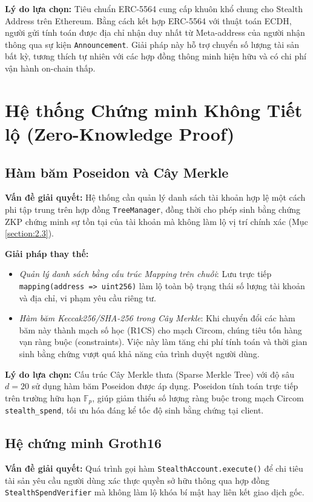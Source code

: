 \documentclass[../DoAn.tex]{subfiles}
\begin{document}
\textbf{Lý do lựa chọn:} Tiêu chuẩn ERC-5564 \cite{erc5564} cung cấp khuôn khổ chung cho Stealth Address trên Ethereum. Bằng cách kết hợp ERC-5564 với thuật toán ECDH, người gửi tính toán được địa chỉ nhận duy nhất từ Meta-address của người nhận thông qua sự kiện \texttt{Announcement}. Giải pháp này hỗ trợ chuyển số lượng tài sản bất kỳ, tương thích tự nhiên với các hợp đồng thông minh hiện hữu và có chi phí vận hành on-chain thấp.

\section{Hệ thống Chứng minh Không Tiết lộ (Zero-Knowledge Proof)}
\label{sec:3.2}

\subsection{Hàm băm Poseidon và Cây Merkle}
\textbf{Vấn đề giải quyết:} Hệ thống cần quản lý danh sách tài khoản hợp lệ một cách phi tập trung trên hợp đồng \texttt{TreeManager}, đồng thời cho phép sinh bằng chứng ZKP chứng minh sự tồn tại của tài khoản mà không làm lộ vị trí chính xác (Mục \ref{section:2.3}).

\textbf{Giải pháp thay thế:}
\begin{itemize}
    \item \textit{Quản lý danh sách bằng cấu trúc Mapping trên chuỗi}: Lưu trực tiếp \texttt{mapping(address => uint256)} làm lộ toàn bộ trạng thái số lượng tài khoản và địa chỉ, vi phạm yêu cầu riêng tư.
    \item \textit{Hàm băm Keccak256/SHA-256 trong Cây Merkle}: Khi chuyển đổi các hàm băm này thành mạch số học (R1CS) cho mạch Circom, chúng tiêu tốn hàng vạn ràng buộc (constraints). Việc này làm tăng chi phí tính toán và thời gian sinh bằng chứng vượt quá khả năng của trình duyệt người dùng.
\end{itemize}

\textbf{Lý do lựa chọn:} Cấu trúc Cây Merkle thưa (Sparse Merkle Tree) với độ sâu $d=20$ sử dụng hàm băm Poseidon \cite{poseidon} được áp dụng. Poseidon tính toán trực tiếp trên trường hữu hạn $\mathbb{F}_p$, giúp giảm thiểu số lượng ràng buộc trong mạch Circom \texttt{stealth\_spend}, tối ưu hóa đáng kể tốc độ sinh bằng chứng tại client.

\subsection{Hệ chứng minh Groth16}
\textbf{Vấn đề giải quyết:} Quá trình gọi hàm \texttt{StealthAccount.execute()} để chi tiêu tài sản yêu cầu người dùng xác thực quyền sở hữu thông qua hợp đồng \texttt{StealthSpendVerifier} mà không làm lộ khóa bí mật hay liên kết giao dịch gốc.
\end{document}
